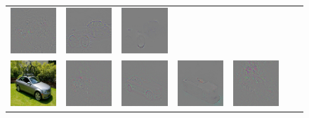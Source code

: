 \begin{figure}
\begin{center}
\begin{tabular}{ccccccc}
\includegraphics[width=0.14\linewidth,height=0.11\linewidth]{figs/examples/googlenet/oxford/bic-car1_diff_672} &
\includegraphics[width=0.14\linewidth,height=0.11\linewidth]{figs/examples/googlenet/deconv/bic-car1_diff_672} &
\includegraphics[width=0.14\linewidth,height=0.11\linewidth]{figs/examples/googlenet/soft/bic-car1_diff_672} \\
\vspace{-2.5pt}
\includegraphics[width=0.14\linewidth,height=0.11\linewidth]{figs/examples/googlenet/oxford/bic-car2} &
\includegraphics[width=0.14\linewidth,height=0.11\linewidth]{figs/examples/googlenet/oxford/bic-car2_diff_818} &
\includegraphics[width=0.14\linewidth,height=0.11\linewidth]{figs/examples/googlenet/deconv/bic-car2_diff_818} &
\includegraphics[width=0.14\linewidth,height=0.11\linewidth]{figs/examples/googlenet/soft/bic-car2_diff_818} &
\includegraphics[width=0.14\linewidth,height=0.11\linewidth]{figs/examples/googlenet/oxford/bic-car2_diff_672} &

\end{tabular}
\end{center}
\end{figure}
